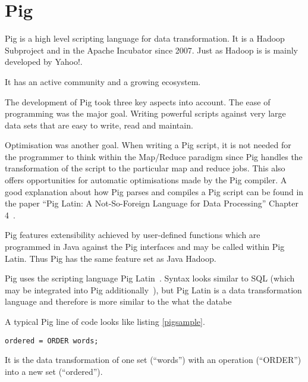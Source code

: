 \section{Pig}

Pig is a high level scripting language for data transformation. It is a Hadoop Subproject and in the Apache Incubator since 2007. Just as Hadoop is is mainly developed by Yahoo!. 

It has an active community and a growing ecosystem.

The development of Pig took three key aspects into account. The ease of programming was the major goal. Writing powerful scripts against very large data sets that are easy to write, read and maintain.~\cite{pigWebsite}

Optimisation was another goal. When writing a Pig script, it is not needed for the programmer to think within the Map/Reduce paradigm since Pig handles the transformation of the script to the particular map and reduce jobs. This also offers opportunities for automatic optimisations made by the Pig compiler. A good explanation about how Pig parses and compiles a Pig script can be found in the paper ``Pig Latin: A Not-So-Foreign Language for Data Processing'' Chapter 4~\cite{pigNotForeign}.

Pig features extensibility achieved by user-defined functions which are programmed in Java against the Pig interfaces and may be called within Pig Latin. Thus Pig has the same feature set as Java Hadoop.

Pig uses the scripting language Pig Latin~\cite{pigManual}. Syntax looks similar to SQL (which may be integrated into Pig additionally~\cite{pigSql}), but Pig Latin is a data transformation language and therefore is more similar to the what the databe  

A typical Pig line of code looks like listing \ref{pigsample}.

\begin{lstlisting}[language=pig,caption=A typical Pig line of code,float,label=pigsample]
ordered = ORDER words;
\end{lstlisting}

It is the data transformation of one set (``words'') with an operation (``ORDER'') into a new set (``ordered'').
                                                                                                               